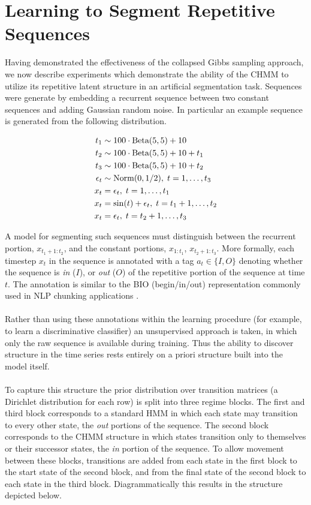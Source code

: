 \documentclass[12pt]{report}
\newcommand{\1}[0]{\mathbbm{1}}
\newcommand{\Beta}[0]{\textnormal{Beta}}
\newcommand{\Norm}[0]{\textnormal{Norm}}
\newcommand{\seq}[3]{\ensuremath{#1_{{#2}:{#3}}}}
\begin{document}
\section{Learning to Segment Repetitive Sequences}
\label{sec:Learning to Segment Repetitive Sequences}
Having demonstrated the effectiveness of the collapsed Gibbs sampling approach,
we now describe experiments which demonstrate the ability of the \ac{CHMM} to utilize its repetitive
latent structure in an artificial segmentation task. Sequences were generate by
embedding a recurrent sequence between two constant sequences and adding Gaussian random noise.
In particular an example sequence is generated from the following distribution.

\begin{align*}
    t_1 & \sim 100 \cdot \Beta(5, 5) + 10 \\
    t_2 & \sim 100 \cdot \Beta(5, 5) + 10 + t_1 \\
    t_3 & \sim 100 \cdot \Beta(5, 5) + 10 + t_2 \\
    \epsilon_t & \sim \Norm(0, 1/2),\; t = 1,\ldots,t_3 \\
    x_t &= \epsilon_t,\; t=1,\ldots,t_1 \\
    x_t &= \sin(t) + \epsilon_t,\; t=t_1+1,\ldots,t_2 \\
    x_t &= \epsilon_t,\; t=t_2 + 1,\ldots,t_3\\
\end{align*}

A model for segmenting such sequences must distinguish between the recurrent portion,
$\seq{x}{t_1+1}{t_2}$, and the constant portions, $\seq{x}{1}{t_1}$, $\seq{x}{t_2+1}{t_3}$.
More formally, each timestep $x_t$ in the sequence is annotated with a tag $a_t \in \{I, O\}$
denoting whether the sequence is \emph{in} ($I$), or \emph{out} ($O$) of the repetitive portion
of the sequence at time $t$. The annotation is similar to the BIO (begin/in/out) representation
commonly used in \ac{NLP} chunking applications \cite{ramshaw-bio}.
\\\\
Rather than using these annotations within the learning procedure (for example, to learn a
discriminative classifier) an unsupervised approach is taken, in which only the raw sequence
is available during training. Thus the ability to discover structure in the time series rests
entirely on a priori structure built into the model itself.
\\\\
To capture this structure the prior distribution over transition matrices
(a Dirichlet distribution for each row) is split into three regime blocks.
The first and third block corresponds to a standard \ac{HMM}
in which each state may transition to every other state, the \emph{out} portions of the sequence.
The second block corresponds to the \ac{CHMM} structure in which states transition
only to themselves or their successor states, the \emph{in} portion of the sequence.
To allow movement between these blocks, transitions are added from each state in the first block
to the start state of the second block, and from the final state of the second block to each state
in the third block. Diagrammatically this results in the structure depicted below.
\end{document}

